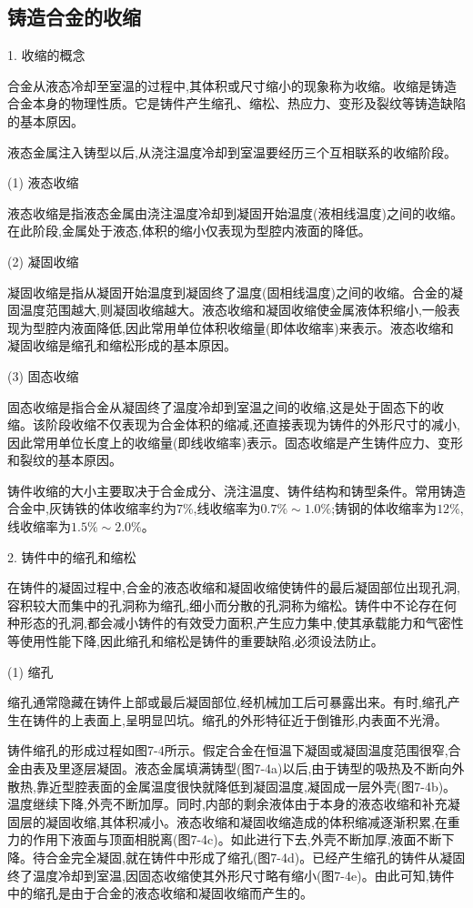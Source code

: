 \documentclass[UTF8]{ctexbook}
\newcommand{\◎}{\ensuremath{\bigcirc}}
\begin{document}
\subsection{铸造合金的收缩}

1. 收缩的概念

合金从液态冷却至室温的过程中,其体积或尺寸缩小的现象称为收缩。收缩是铸造合金本身的物理性质。它是铸件产生缩孔、缩松、热应力、变形及裂纹等铸造缺陷的基本原因。

液态金属注入铸型以后,从浇注温度冷却到室温要经历三个互相联系的收缩阶段。

(1) 液态收缩

液态收缩是指液态金属由浇注温度冷却到凝固开始温度(液相线温度)之间的收缩。在此阶段,金属处于液态,体积的缩小仅表现为型腔内液面的降低。

(2) 凝固收缩

凝固收缩是指从凝固开始温度到凝固终了温度(固相线温度)之间的收缩。合金的凝固温度范围越大,则凝固收缩越大。液态收缩和凝固收缩使金属液体积缩小,一般表现为型腔内液面降低,因此常用单位体积收缩量(即体收缩率)来表示。液态收缩和凝固收缩是缩孔和缩松形成的基本原因。

(3) 固态收缩

固态收缩是指合金从凝固终了温度冷却到室温之间的收缩,这是处于固态下的收缩。该阶段收缩不仅表现为合金体积的缩减,还直接表现为铸件的外形尺寸的减小,因此常用单位长度上的收缩量(即线收缩率)表示。固态收缩是产生铸件应力、变形和裂纹的基本原因。

铸件收缩的大小主要取决于合金成分、浇注温度、铸件结构和铸型条件。常用铸造合金中,灰铸铁的体收缩率约为$7\%$,线收缩率为$0.7\%\sim1.0\%$;铸钢的体收缩率为$12\%$,线收缩率为$1.5\%\sim2.0\%$。

2. 铸件中的缩孔和缩松

在铸件的凝固过程中,合金的液态收缩和凝固收缩使铸件的最后凝固部位出现孔洞,容积较大而集中的孔洞称为缩孔,细小而分散的孔洞称为缩松。铸件中不论存在何种形态的孔洞,都会减小铸件的有效受力面积,产生应力集中,使其承载能力和气密性等使用性能下降,因此缩孔和缩松是铸件的重要缺陷,必须设法防止。

(1) 缩孔

缩孔通常隐藏在铸件上部或最后凝固部位,经机械加工后可暴露出来。有时,缩孔产生在铸件的上表面上,呈明显凹坑。缩孔的外形特征近于倒锥形,内表面不光滑。

铸件缩孔的形成过程如图7-4所示。假定合金在恒温下凝固或凝固温度范围很窄,合金由表及里逐层凝固。液态金属填满铸型(图7-4a)以后,由于铸型的吸热及不断向外散热,靠近型腔表面的金属温度很快就降低到凝固温度,凝固成一层外壳(图7-4b)。温度继续下降,外壳不断加厚。同时,内部的剩余液体由于本身的液态收缩和补充凝固层的凝固收缩,其体积减小。液态收缩和凝固收缩造成的体积缩减逐渐积累,在重力的作用下液面与顶面相脱离(图7-4c)。如此进行下去,外壳不断加厚,液面不断下降。待合金完全凝固,就在铸件中形成了缩孔(图7-4d)。已经产生缩孔的铸件从凝固终了温度冷却到室温,因固态收缩使其外形尺寸略有缩小(图7-4e)。由此可知,铸件中的缩孔是由于合金的液态收缩和凝固收缩而产生的。
\end{document}
